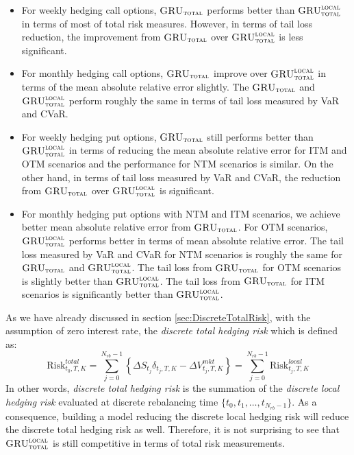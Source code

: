 \documentclass[letterpaper,12pt,titlepage,oneside,final]{book}
\numberwithin{equation}{section}
\theoremstyle{definition}
\newcommand{\modelT}{\textsc{GRU}_{\textsc{total}}}
\newcommand{\modelL}{\textsc{GRU}_{\textsc{total}}^{\textsc{local}}}
\newcommand{\Vmkt}{V^{mkt}}
\newcommand{\Smkt}{S}
\begin{document}
\begin{itemize}
	\item For weekly hedging call options, $\modelT$ performs better than $\modelL$ in terms of most of total risk measures. However, in terms of tail loss reduction, the improvement from $\modelT$ over   $\modelL$ is less significant.
	\item For monthly hedging call options, $\modelT$ improve over $\modelL$ in terms of  the mean absolute relative error slightly.  The $\modelT$ and $\modelL$ perform roughly the same in terms of tail loss measured by VaR and CVaR.
	\item For weekly hedging put options, $\modelT$ still performs better than $\modelL$ in terms of reducing the mean absolute relative error for ITM and OTM scenarios and the performance for NTM scenarios is similar. On the other hand, in terms of tail loss measured by VaR and CVaR, the reduction from $\modelT$ over $\modelL$ is significant.
	\item For monthly hedging put options with NTM and ITM scenarios, we achieve better  mean absolute relative error from $\modelT$. For OTM scenarios,   $\modelL$ performs better in terms of mean absolute relative error. The tail loss measured by VaR and CVaR for NTM scenarios is roughly the same for $\modelT$ and $\modelL$. The tail loss from $\modelT$ for OTM scenarios is slightly better than $\modelL$. The tail loss from $\modelT$ for ITM scenarios is significantly better than $\modelL$.
\end{itemize}

As we have already discussed in section \ref{sec:DiscreteTotalRisk}, with the assumption of zero interest rate, the {\em discrete total hedging risk} which is defined as:
\begin{equation}
\text{Risk}^{total}_{t_0,T,K}=\sum_{j=0}^{N_{rb}-1}\left\{ \Delta \Smkt_{t_j} \delta_{t_j,T,K} -\Delta \Vmkt_{t_j,T,K} \right\}=\sum_{j=0}^{N_{rb}-1}\text{Risk}^{local}_{t_j,T,K}
\end{equation}
In other words, {\em discrete total hedging risk} is the summation of the {\em discrete local hedging risk} evaluated at discrete rebalancing time $\{t_0,t_1,\dots,t_{N_{rb}-1}\}$. As a consequence, building a model reducing the discrete local hedging risk will reduce the discrete total hedging risk as well. Therefore, it is not surprising to see that $\modelL$ is still competitive in terms of total risk measurements.
\end{document}
